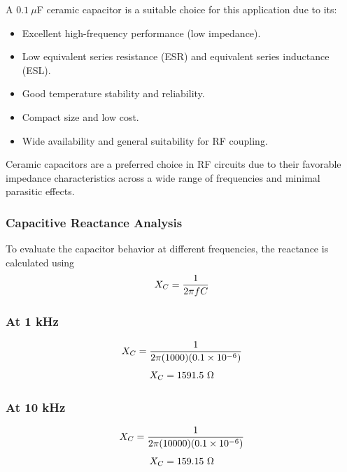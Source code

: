 \documentclass[12pt,a4paper]{report}
\begin{document}
	A $0.1\ \mu$F ceramic capacitor is a suitable choice for this application due to its:
	\begin{itemize}
		\item Excellent high-frequency performance (low impedance).
		\item Low equivalent series resistance (ESR) and equivalent series inductance (ESL).
		\item Good temperature stability and reliability.
		\item Compact size and low cost.
		\item Wide availability and general suitability for RF coupling.
	\end{itemize}
	
	Ceramic capacitors are a preferred choice in RF circuits due to their favorable impedance characteristics across a wide range of frequencies and minimal parasitic effects.
	\subsubsection{Capacitive Reactance Analysis}
	To evaluate the capacitor behavior at different frequencies, the reactance is calculated using
	\begingroup
	\setlength{\mathindent}{0pt}
	\begin{equation*}
		\hfill
		X_C = \frac{1}{2\pi fC}
		\hfill
	\end{equation*}
	\endgroup
	
	\subsubsection*{At 1 kHz}
	\begingroup
	\setlength{\mathindent}{0pt}
	\begin{equation*}
		\hfill
		X_C = \frac{1}{2\pi(1000)(0.1 \times 10^{-6})}
		\hfill
	\end{equation*}
	\endgroup
	\begingroup
	\setlength{\mathindent}{0pt}
	\begin{equation*}
		\hfill
		X_C = 1591.5\ \Omega
		\hfill
	\end{equation*}
	\endgroup
	
	\subsubsection*{At 10 kHz}
	\begingroup
	\setlength{\mathindent}{0pt}
	\begin{equation*}
		\hfill
		X_C = \frac{1}{2\pi(10000)(0.1 \times 10^{-6})}
		\hfill
	\end{equation*}
	\endgroup
	\begingroup
	\setlength{\mathindent}{0pt}
	\begin{equation*}
		\hfill
		X_C = 159.15\ \Omega
		\hfill
	\end{equation*}
	\endgroup
	
\end{document}
